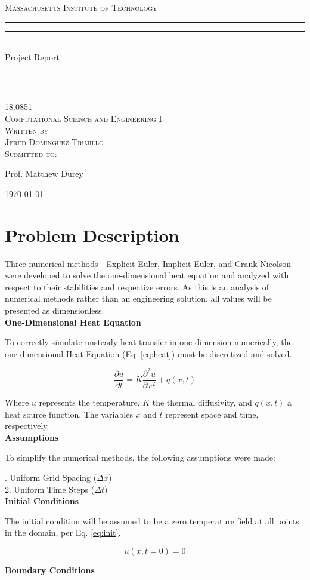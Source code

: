 \documentclass[10pt, letter, showtrims]{extarticle}
\newcommand{\University}{Massachusetts Institute of Technology}
\newcommand{\ClassCode}{18.0851}
\newcommand{\ClassTitle}{Computational Science and Engineering I}
\newcommand{\Title}{Project Report}
\newcommand{\FirstName}{Jered}
\newcommand{\LastName}{Dominguez-Trujillo}
\newcommand{\ProfTitle}{Prof.}
\newcommand{\ProfFirst}{Matthew}
\newcommand{\ProfLast}{Durey}
\newcommand*{\titleGP}{\begingroup %
\centering %

\textsc{\LARGE \University{}} \\[2\baselineskip] %

\rule{\textwidth}{1.6pt}\vspace*{-\baselineskip}\vspace*{2pt} %
\rule{\textwidth}{0.4pt}\\[\baselineskip] %

{\LARGE \Title{}}\\[0.2\baselineskip] %

\rule{\textwidth}{0.4pt}\vspace*{-\baselineskip}\vspace{3.2pt} %
\rule{\textwidth}{1.6pt}\\[\baselineskip] %

\scshape %
{\large \ClassCode{}} \\[0.5\baselineskip]
{\large \ClassTitle{}} \\[4\baselineskip]


Written by \\[0.5\baselineskip]
{\Large \FirstName{} \LastName{}}\\[2\baselineskip] %
Submitted to: \\[0.5\baselineskip]
{\Large \ProfTitle{} \ProfFirst{} \ProfLast{}\par} %
\vspace*{16\baselineskip}
{\large \today}\par 
\vfill %

\endgroup}
\begin{document}
 
	\begin{titlepage}
		\titleGP{}
	\end{titlepage}

	\section{Problem Description}

		\noindent
		Three numerical methods - Explicit Euler, Implicit Euler, and Crank-Nicolson - were developed to solve the one-dimensional heat equation and analyzed with respect to their stabilities and respective errors. As this is an analysis of numerical methods rather than an engineering solution, all values will be presented as dimensionless. \\
		
		\noindent
		\textbf{One-Dimensional Heat Equation}
		
		\noindent
		To correctly simulate unsteady heat transfer in one-dimension numerically, the one-dimensional Heat Equation (Eq. \ref{eq:heat}) must be discretized and solved.
		
		\begin{equation}
			\label{eq:heat}
			\frac{\partial u}{\partial t} = K \frac{\partial^{2} u}{\partial x^{2}} + q(x, t)
		\end{equation}

		\noindent
		Where $u$ represents the temperature, $K$ the thermal diffusivity, and $q(x,t)$ a heat source function. The variables $x$ and $t$ represent space and time, respectively.\\		
		
		\noindent
		\textbf{Assumptions}
	
		\noindent
		To simplify the numerical methods, the following assumptions were made:
		
		. Uniform Grid Spacing ($\Delta x$) \\
		2. Uniform Time Steps   ($\Delta t$) \\	

		\noindent
		\textbf{Initial Conditions}
		
		\noindent
		The initial condition will be assumed to be a zero temperature field at all points in the domain, per Eq. \ref{eq:init}.
		
		\begin{equation}
		\label{eq:init}
			u(x, t = 0) = 0
		\end{equation}	
	
		\noindent
		\textbf{Boundary Conditions}
\end{document}
